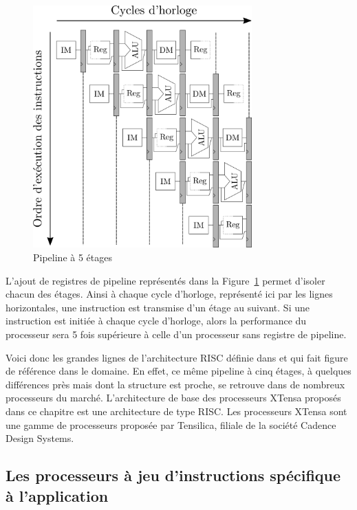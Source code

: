 \begin{figure}[t]
\centering
\includegraphics[width=0.75\textwidth]{main/ch3_fig/pipelines}
\caption{Pipeline à 5 étages}
\label{fig:pipelines}
\end{figure}


L'ajout de registres de pipeline représentés dans la Figure~\ref{fig:pipelines} permet d'isoler chacun des étages. Ainsi à chaque cycle d'horloge, représenté ici par les lignes horizontales, une instruction est transmise d'un étage au suivant. Si une instruction est initiée à chaque cycle d'horloge, alors la performance du processeur sera 5 fois supérieure à celle d'un processeur sans registre de pipeline.

Voici donc les grandes lignes de l'architecture RISC définie dans \cite{hennessy2011computer} et qui fait figure de référence dans le domaine. En effet, ce même pipeline à cinq étages, à quelques différences près mais dont la structure est proche, se retrouve dans de nombreux processeurs du marché. L'architecture de base des processeurs XTensa proposés dans ce chapitre est une architecture de type RISC. Les processeurs XTensa sont une gamme de processeurs proposée par Tensilica, filiale de la société Cadence Design Systems.

\subsection{Les processeurs à jeu d'instructions spécifique à l'application}

